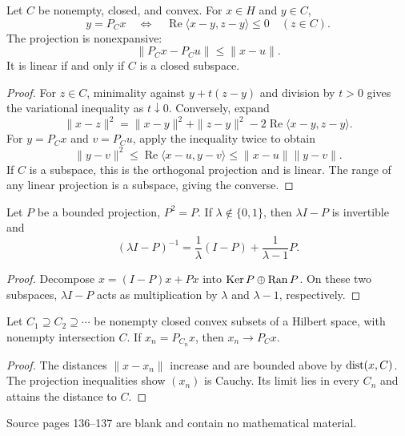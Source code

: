 \begin{notetheorem}
Let $C$ be nonempty, closed, and convex.  For $x\in H$ and $y\in C$,
\[
  y=P_Cx
  \quad\Longleftrightarrow\quad
  \operatorname{Re}\langle x-y,z-y\rangle\le0
  \quad(z\in C).
\]
The projection is nonexpansive:
\[
  \|P_Cx-P_Cu\|\le\|x-u\|.
\]
It is linear if and only if $C$ is a closed subspace.
\end{notetheorem}

\begin{proof}
For $z\in C$, minimality against $y+t(z-y)$ and division by $t>0$ gives the
variational inequality as $t\downarrow0$.  Conversely, expand
\[
 \|x-z\|^2=\|x-y\|^2+\|z-y\|^2
            -2\operatorname{Re}\langle x-y,z-y\rangle.
\]
For $y=P_Cx$ and $v=P_Cu$, apply the inequality twice to obtain
\[
  \|y-v\|^2\le\operatorname{Re}\langle x-u,y-v\rangle
  \le\|x-u\|\|y-v\|.
\]
If $C$ is a subspace, this is the orthogonal projection and is linear.  The
range of any linear projection is a subspace, giving the converse.
\end{proof}

\begin{noteexercise}
Let $P$ be a bounded projection, $P^2=P$.  If $\lambda\notin\{0,1\}$, then
$\lambda I-P$ is invertible and
\[
  (\lambda I-P)^{-1}
  =\frac1\lambda(I-P)+\frac1{\lambda-1}P.
\]
\end{noteexercise}

\begin{proof}
Decompose $x=(I-P)x+Px$ into $\operatorname{Ker} P\oplus\operatorname{Ran} P$.  On these two subspaces,
$\lambda I-P$ acts as multiplication by $\lambda$ and $\lambda-1$,
respectively.
\end{proof}

\begin{noteexercise}
Let $C_1\supseteq C_2\supseteq\cdots$ be nonempty closed convex subsets of a
Hilbert space, with nonempty intersection $C$.  If $x_n=P_{C_n}x$, then
$x_n\to P_Cx$.
\end{noteexercise}

\begin{proof}
The distances $\|x-x_n\|$ increase and are bounded above by
$\operatorname{dist}(x,C)$.  The projection inequalities show $(x_n)$ is Cauchy.  Its limit
lies in every $C_n$ and attains the distance to $C$.
\end{proof}

\begin{noteremark}
Source pages 136--137 are blank and contain no mathematical material.
\end{noteremark}

